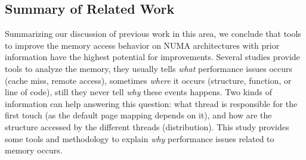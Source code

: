 
\subsection{Summary of Related Work}

Summarizing our discussion of previous work in this area, we conclude that
tools to improve the memory access behavior on NUMA architectures with prior
information have the highest potential for improvements.  Several studies
provide tools to analyze the memory, they usually tells \emph{what}
performance issues occurs (cache miss, remote access), sometimes \emph{where}
it occurs (structure, function, or line of code), still they never tell
\emph{why} these events happens.  Two kinds of information can help answering
this question: what thread is responsible for the first touch (as the default
page mapping depends on it), and how are the structure accessed by the
different threads (distribution). This study provides some tools and methodology to explain
\emph{why} performance issues related to memory occurs.




